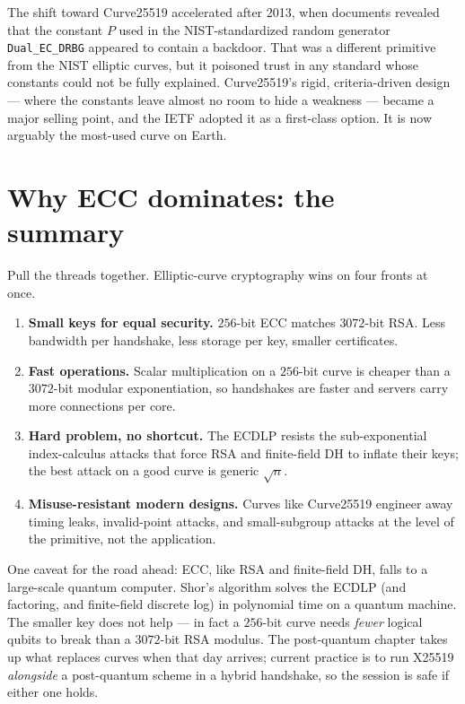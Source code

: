 \begin{historybox}
The shift toward Curve25519 accelerated after 2013, when documents revealed that the
constant $P$ used in the NIST-standardized random generator \texttt{Dual\_EC\_DRBG}
appeared to contain a backdoor. That was a different primitive from the NIST elliptic
curves, but it poisoned trust in any standard whose constants could not be fully
explained. Curve25519's rigid, criteria-driven design --- where the constants leave
almost no room to hide a weakness --- became a major selling point, and the IETF adopted
it as a first-class option. It is now arguably the most-used curve on Earth.
\end{historybox}

\section{Why ECC dominates: the summary}
\label{ch21:dominance}

Pull the threads together. Elliptic-curve cryptography wins on four fronts at once.

\begin{enumerate}
  \item \textbf{Small keys for equal security.} $256$-bit ECC matches $3072$-bit RSA.
        Less bandwidth per handshake, less storage per key, smaller certificates.
  \item \textbf{Fast operations.} Scalar multiplication on a $256$-bit curve is cheaper
        than a $3072$-bit modular exponentiation, so handshakes are faster and servers
        carry more connections per core.
  \item \textbf{Hard problem, no shortcut.} The ECDLP resists the sub-exponential
        index-calculus attacks that force RSA and finite-field DH to inflate their keys;
        the best attack on a good curve is generic $\sqrt n$.
  \item \textbf{Misuse-resistant modern designs.} Curves like Curve25519 engineer away
        timing leaks, invalid-point attacks, and small-subgroup attacks at the level of
        the primitive, not the application.
\end{enumerate}

\begin{marginnotebox}
One caveat for the road ahead: ECC, like RSA and finite-field DH, falls to a large-scale
quantum computer. Shor's algorithm solves the ECDLP (and factoring, and finite-field
discrete log) in polynomial time on a quantum machine. The smaller key does not help ---
in fact a $256$-bit curve needs \emph{fewer} logical qubits to break than a $3072$-bit
RSA modulus. The post-quantum chapter takes up what replaces curves when that day
arrives; current practice is to run X25519 \emph{alongside} a post-quantum scheme in a
hybrid handshake, so the session is safe if either one holds.
\end{marginnotebox}

